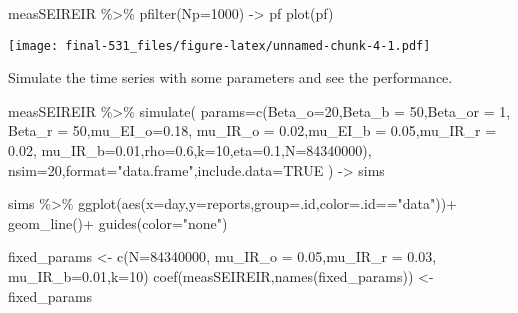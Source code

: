\documentclass[
]{article}
\newenvironment{Shaded}{\begin{snugshade}}{\end{snugshade}}
\newcommand{\AttributeTok}[1]{\textcolor[rgb]{0.77,0.63,0.00}{#1}}
\newcommand{\ConstantTok}[1]{\textcolor[rgb]{0.00,0.00,0.00}{#1}}
\newcommand{\DecValTok}[1]{\textcolor[rgb]{0.00,0.00,0.81}{#1}}
\newcommand{\FloatTok}[1]{\textcolor[rgb]{0.00,0.00,0.81}{#1}}
\newcommand{\FunctionTok}[1]{\textcolor[rgb]{0.00,0.00,0.00}{#1}}
\newcommand{\NormalTok}[1]{#1}
\newcommand{\OtherTok}[1]{\textcolor[rgb]{0.56,0.35,0.01}{#1}}
\newcommand{\SpecialCharTok}[1]{\textcolor[rgb]{0.00,0.00,0.00}{#1}}
\newcommand{\StringTok}[1]{\textcolor[rgb]{0.31,0.60,0.02}{#1}}
\begin{document}
\begin{Shaded}
\begin{Highlighting}[]
\NormalTok{measSEIREIR }\SpecialCharTok{\%\textgreater{}\%}
  \FunctionTok{pfilter}\NormalTok{(}\AttributeTok{Np=}\DecValTok{1000}\NormalTok{) }\OtherTok{{-}\textgreater{}}\NormalTok{ pf}
\FunctionTok{plot}\NormalTok{(pf)}
\end{Highlighting}
\end{Shaded}

\texttt{[image: final-531\_files/figure-latex/unnamed-chunk-4-1.pdf]}

Simulate the time series with some parameters and see the performance.

\begin{Shaded}
\begin{Highlighting}[]
\NormalTok{measSEIREIR }\SpecialCharTok{\%\textgreater{}\%}
\FunctionTok{simulate}\NormalTok{(}
\AttributeTok{params=}\FunctionTok{c}\NormalTok{(}\AttributeTok{Beta\_o=}\DecValTok{20}\NormalTok{,}\AttributeTok{Beta\_b =} \DecValTok{50}\NormalTok{,}\AttributeTok{Beta\_or =} \DecValTok{1}\NormalTok{, }\AttributeTok{Beta\_r =} \DecValTok{50}\NormalTok{,}\AttributeTok{mu\_EI\_o=}\FloatTok{0.18}\NormalTok{,}
             \AttributeTok{mu\_IR\_o =} \FloatTok{0.02}\NormalTok{,}\AttributeTok{mu\_EI\_b =} \FloatTok{0.05}\NormalTok{,}\AttributeTok{mu\_IR\_r =} \FloatTok{0.02}\NormalTok{, }
             \AttributeTok{mu\_IR\_b=}\FloatTok{0.01}\NormalTok{,}\AttributeTok{rho=}\FloatTok{0.6}\NormalTok{,}\AttributeTok{k=}\DecValTok{10}\NormalTok{,}\AttributeTok{eta=}\FloatTok{0.1}\NormalTok{,}\AttributeTok{N=}\DecValTok{84340000}\NormalTok{),}
\AttributeTok{nsim=}\DecValTok{20}\NormalTok{,}\AttributeTok{format=}\StringTok{"data.frame"}\NormalTok{,}\AttributeTok{include.data=}\ConstantTok{TRUE}
\NormalTok{) }\OtherTok{{-}\textgreater{}}\NormalTok{ sims}

\NormalTok{sims }\SpecialCharTok{\%\textgreater{}\%}
\FunctionTok{ggplot}\NormalTok{(}\FunctionTok{aes}\NormalTok{(}\AttributeTok{x=}\NormalTok{day,}\AttributeTok{y=}\NormalTok{reports,}\AttributeTok{group=}\NormalTok{.id,}\AttributeTok{color=}\NormalTok{.id}\SpecialCharTok{==}\StringTok{"data"}\NormalTok{))}\SpecialCharTok{+}
\FunctionTok{geom\_line}\NormalTok{()}\SpecialCharTok{+}
\FunctionTok{guides}\NormalTok{(}\AttributeTok{color=}\StringTok{"none"}\NormalTok{)}
\end{Highlighting}
\end{Shaded}

\begin{Shaded}
\begin{Highlighting}[]
\NormalTok{fixed\_params }\OtherTok{\textless{}{-}} \FunctionTok{c}\NormalTok{(}\AttributeTok{N=}\DecValTok{84340000}\NormalTok{, }\AttributeTok{mu\_IR\_o =} \FloatTok{0.05}\NormalTok{,}\AttributeTok{mu\_IR\_r =} \FloatTok{0.03}\NormalTok{, }
             \AttributeTok{mu\_IR\_b=}\FloatTok{0.01}\NormalTok{,}\AttributeTok{k=}\DecValTok{10}\NormalTok{)}
\FunctionTok{coef}\NormalTok{(measSEIREIR,}\FunctionTok{names}\NormalTok{(fixed\_params)) }\OtherTok{\textless{}{-}}\NormalTok{ fixed\_params}
\end{Highlighting}
\end{Shaded}
\end{document}
